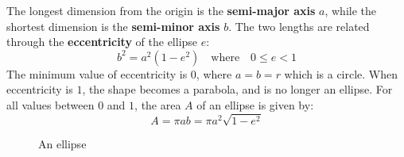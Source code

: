 \documentclass[11pt]{article}
\begin{document}
The longest dimension from the origin is the \textbf{semi-major axis} $a$, while
the shortest dimension is the \textbf{semi-minor axis} $b$. The two lengths are
related through the \textbf{eccentricity} of the ellipse $e$:
\begin{equation}
  b^2=a^2(1-e^2)\quad\text{where}\quad 0\leq e < 1
\end{equation}
The minimum value of eccentricity is $0$, where $a=b=r$ which is a circle. When
eccentricity is $1$, the shape becomes a parabola, and is no longer an ellipse.
For all values between $0$ and $1$, the area $A$ of an ellipse is given by:
\begin{equation}
  A=\pi ab=\pi a^2\sqrt{1-e^2}
  \label{A2}
\end{equation}

\begin{figure}[!h]
  \centering
  \caption{An ellipse}
  \label{ellipse}
\end{figure}
\end{document}
